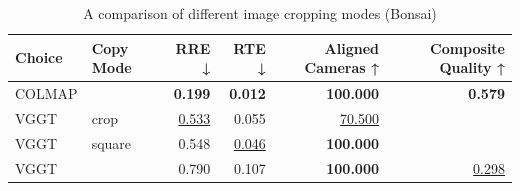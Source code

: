 \begin{table}[H]
\caption{A comparison of different image cropping modes (Bonsai)}
\label{tab:99_copy_mode_bonsai}
\begin{tabular}{llrrrr}
\toprule
Choice & Copy Mode & RRE ↓ & RTE ↓ & Aligned Cameras ↑ & Composite Quality ↑ \\
\midrule
COLMAP &  & \textbf{0.199} & \textbf{0.012} & \textbf{100.000} & \textbf{0.579} \\
VGGT & crop & \underline{0.533} & 0.055 & \underline{70.500} &  \\
VGGT & square & 0.548 & \underline{0.046} & \textbf{100.000} &  \\
VGGT &  & 0.790 & 0.107 & \textbf{100.000} & \underline{0.298} \\
\bottomrule
\end{tabular}
\end{table}
